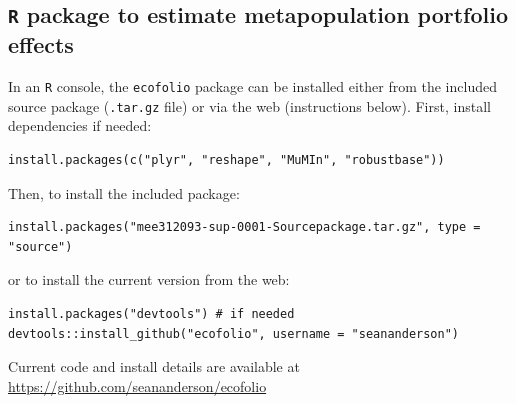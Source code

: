

\subsection{\texttt{R} package to estimate metapopulation portfolio effects}

In an \texttt{R} console, the \texttt{ecofolio} package can be installed either
from the included source package (\texttt{.tar.gz} file)
or via the web (instructions below). First, install dependencies if needed:

\begin{verbatim}
install.packages(c("plyr", "reshape", "MuMIn", "robustbase"))
\end{verbatim}

\noindent
Then, to install the included package:


\begin{verbatim}
install.packages("mee312093-sup-0001-Sourcepackage.tar.gz", type = "source")
\end{verbatim}


\noindent
or to install the current version from the web:

\begin{verbatim}
install.packages("devtools") # if needed
devtools::install_github("ecofolio", username = "seananderson")
\end{verbatim}

\noindent
Current code and install details are available at\\ \url{https://github.com/seananderson/ecofolio}
\clearpage

